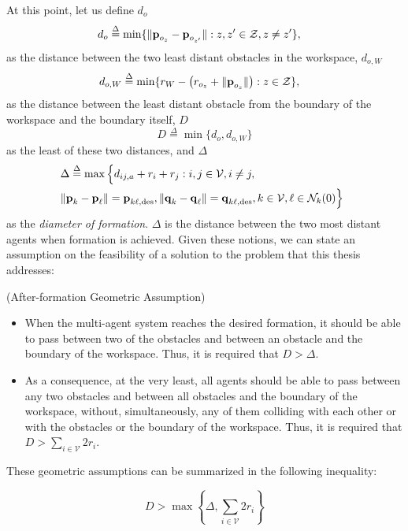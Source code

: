 At this point, let us define $d_o$
\begin{align*}
  d_o &\overset{\Delta}{=} \min\{\| \bm{\mathbf{p}}_{o_z} - \bm{\mathbf{p}}_{o_{z'}}\| : z,z' \in \mathcal{Z}, z \neq z' \},
\end{align*}
as the distance between the two least distant obstacles in the workspace,
$d_{o,W}$
\begin{align*}
  d_{o,W} &\overset{\Delta}{=} \min\{r_W - \left( r_{o_z} + \| \bm{\mathbf{p}}_{o_z} \| \right) : z \in \mathcal{Z}\},
\end{align*}
as the distance between the least distant obstacle from the boundary of the
workspace and the boundary itself, $D$
\begin{equation*}
  D \overset{\Delta}{=} \min\{d_o, d_{o,W}\}
\end{equation*}
as the least of these two distances, and $\Delta$
\begin{align*}
  &\hspace{-2mm} \Delta \overset{\Delta}{=}  \max\Big\{d_{ij, a}+r_i+r_j: i, j \in \mathcal{V}, i \neq j, \notag \\
  &\hspace{-2mm} \| \vect{p}_k - \vect{p}_\ell \| = \vect{p}_{k \ell,\text{des}},
  \|\vect{q}_k - \vect{q}_\ell\| = \vect{q}_{k \ell,\text{des}},
  k \in \mathcal{V},
  \ell \in \mathcal{N}_k(0)\Big\}
\end{align*}
as the \emph{diameter of formation}. $\Delta$ is the distance between the two
most distant agents when formation is achieved. Given these notions, we
can state an assumption on the feasibility of a solution to the problem
that this thesis addresses:

\begin{gg_box}
\begin{assumption}(After-formation Geometric Assumption)

	\begin{itemize}
		\item When the multi-agent system reaches the desired formation, it should
      be able to pass between two of the obstacles and between an
      obstacle and the boundary of the workspace.
      Thus, it is required that $D > \Delta$.
		\item As a consequence, at the very least, all agents should be able to
      pass between any two obstacles and between all obstacles and the
      boundary of the workspace, without, simultaneously, any of them
      colliding with each other or with the obstacles or the boundary of the
      workspace.
      Thus, it is required that $D >  \sum_{i \in \mathcal{V}}^{} 2r_i$.
	\end{itemize}

	These geometric assumptions can be summarized in the following
  inequality:

	\begin{equation}
    D > \max\left\{\Delta, \sum_{i \in \mathcal{V}}^{} 2r_i \right\}
  \label{eq:geometric_constraint}
	\end{equation}

\end{assumption}
\end{gg_box}
